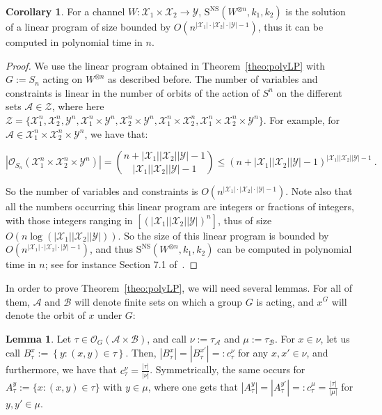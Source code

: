 \documentclass[11pt]{article}
\theoremstyle{definition}
\newtheorem{lem}[theo]{Lemma}
\newtheorem{cor}[theo]{Corollary}
\theoremstyle{remark}
\begin{document}
\begin{cor}
  For a channel $W : \mathcal{X}_1 \times \mathcal{X}_2 \to \mathcal{Y}$, $\mathrm{S}^{\mathrm{NS}}(W^{\otimes n},k_1,k_2)$ is the solution of a linear program of size bounded by $O\left(n^{|\mathcal{X}_1|\cdot|\mathcal{X}_2 |\cdot|\mathcal{Y}|-1}\right)$, thus it can be computed in polynomial time in $n$.
  \label{cor:poly}
\end{cor}
\begin{proof}
  We use the linear program obtained in Theorem~\ref{theo:polyLP} with $G:=S_n$ acting on $W^{\otimes n}$ as described before. 
  The number of variables and constraints is linear in the number of orbits of the action of $S^n$ on the different sets $\mathcal{A} \in \mathcal{Z}$, where here $\mathcal{Z} = \{\mathcal{X}_1^n, \mathcal{X}_2^n, \mathcal{Y}^n, \mathcal{X}^n_1 \times \mathcal{Y}^n, \mathcal{X}^n_2 \times \mathcal{Y}^n, \mathcal{X}^n_1 \times \mathcal{X}^n_2,  \mathcal{X}^n_1 \times \mathcal{X}^n_2 \times \mathcal{Y}^n \}$. For example, for $\mathcal{A} \in \mathcal{X}^n_1 \times \mathcal{X}^n_2 \times \mathcal{Y}^n$, we have that:

\[ |\mathcal{O}_{S_n}(\mathcal{X}^n_1 \times \mathcal{X}^n_2 \times \mathcal{Y}^n)| = \binom{n + |\mathcal{X}_1||\mathcal{X}_2| |\mathcal{Y}|   - 1}{|\mathcal{X}_1| |\mathcal{X}_2| |\mathcal{Y}| - 1} \leq (n+|\mathcal{X}_1||\mathcal{X}_2| |\mathcal{Y}|-1)^{|\mathcal{X}_1||\mathcal{X}_2| |\mathcal{Y}| - 1} \ .\]

So the number of variables and constraints is $O(n^{|\mathcal{X}_1|\cdot|\mathcal{X}_2 |\cdot|\mathcal{Y}|-1})$. Note also that all the numbers occurring this linear program are integers or fractions of integers, with those integers ranging in $\left[\left(|\mathcal{X}_1||\mathcal{X}_2||\mathcal{Y}|\right)^n\right]$, thus of size $O(n\log(|\mathcal{X}_1||\mathcal{X}_2||\mathcal{Y}|))$. So the size of this linear program is bounded by $O(n^{|\mathcal{X}_1|\cdot|\mathcal{X}_2 |\cdot|\mathcal{Y}|-1})$, and thus $\mathrm{S}^{\mathrm{NS}}(W^{\otimes n},k_1,k_2)$ can be computed in polynomial time in $n$; see for instance Section 7.1 of~\cite{GM07}.
\end{proof}

In order to prove Theorem~\ref{theo:polyLP}, we will need several lemmas. For all of them, $\mathcal{A}$ and $\mathcal{B}$ will denote finite sets on which a group $G$ is acting, and $x^G$ will denote the orbit of $x$ under $G$:

\begin{lem}
  \label{lem:orbitProjCard}
  Let $\tau \in \mathcal{O}_G(\mathcal{A} \times \mathcal{B})$, and call $\nu := \tau_{\mathcal{A}}$ and $\mu := \tau_{\mathcal{B}}$. For $x \in \nu$, let us call $B_{\tau}^x := \left\{y:(x,y)\in\tau\right\}$. Then, $|B_{\tau}^x|=|B_{\tau}^{x'}|=:c_{\tau}^{\nu}$ for any $x,x' \in \nu$, and furthermore, we have that $c_{\tau}^{\nu}=\frac{|\tau|}{|\nu|}$. Symmetrically, the same occurs for $A_{\tau}^y := \{x:(x,y)\in\tau\}$ with $y \in \mu$, where one gets that $|A_{\tau}^y|=|A_{\tau}^{y'}|=:c_{\tau}^{\mu}=\frac{|\tau|}{|\mu|}$ for $y,y' \in \mu$.
\end{lem}
\end{document}
